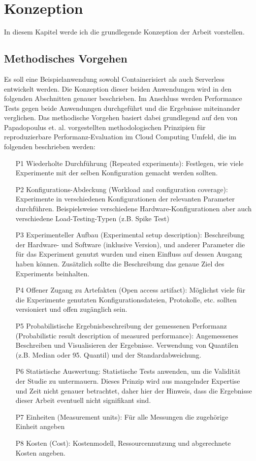 \chapter{Konzeption}
In diesem Kapitel werde ich die grundlegende Konzeption der Arbeit vorstellen.

\section{Methodisches Vorgehen}
Es soll eine Beispielanwendung sowohl Containerisiert als auch Serverless entwickelt werden. Die Konzeption dieser beiden Anwendungen wird in den folgenden Abschnitten genauer beschrieben. 
Im Anschluss werden Performance Tests gegen beide Anwendungen durchgeführt und die Ergebnisse miteinander verglichen. Das methodische Vorgehen basiert dabei grundlegend auf den von Papadopoulus et. al. vorgestellten methodologischen Prinzipien für reproduzierbare Performanz-Evaluation im Cloud Computing Umfeld, die im folgenden beschrieben werden\cite{papadopoulos_methodological_2019}:

\begin{enumerate}
    \item[P1] Wiederholte Durchführung (Repeated experiments): Festlegen, wie viele Experimente mit der selben Konfiguration gemacht werden sollten. 
    \item[P2] Konfigurations-Abdeckung (Workload and configuration coverage): Experimente in verschiedenen Konfigurationen der relevanten Parameter durchführen. Beispielsweise verschiedene Hardware-Konfigurationen aber auch verschiedene Load-Testing-Typen (z.B. Spike Test)
    \item[P3] Experimenteller Aufbau (Experimental setup description): Beschreibung der Hardware- und Software (inklusive Version), und anderer Parameter die für das Experiment genutzt wurden und einen Einfluss auf dessen Ausgang haben können. Zusätzlich sollte die Beschreibung das genaue Ziel des Experiments beinhalten.
    \item[P4] Offener Zugang zu Artefakten (Open access artifact): Möglichst viele für die Experimente genutzten Konfigurationsdateien, Protokolle, etc. sollten versioniert und offen zugänglich sein.
    \item[P5] Probabilistische Ergebnisbeschreibung der gemessenen Performanz (Probabilistic result description of measured performance): Angemessenes Beschreiben und Visualisieren der Ergebnisse. Verwendung von Quantilen (z.B. Median oder 95. Quantil) und der Standardabweichung.
    \item[P6] Statistische Auswertung: Statistische Tests anwenden, um die Validität der Studie zu untermauern. Dieses Prinzip wird aus mangelnder Expertise und Zeit nicht genauer betrachtet, daher hier der Hinweis, dass die Ergebnisse dieser Arbeit eventuell nicht signifikant sind.
    \item[P7] Einheiten (Measurement units): Für alle Messungen die zugehörige Einheit angeben
    \item[P8] Kosten (Cost): Kostenmodell, Ressourcennutzung und abgerechnete Kosten angeben.
\end{enumerate}

